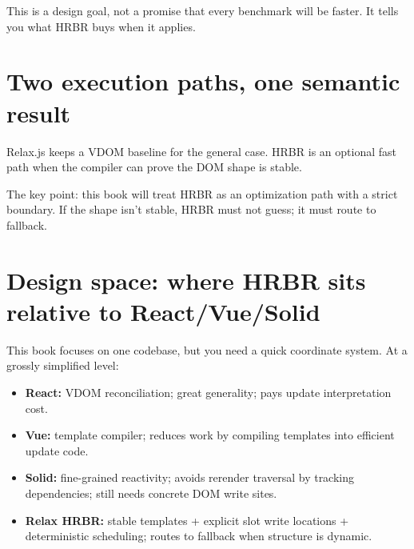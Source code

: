This is a design goal, not a promise that every benchmark will be faster.
It tells you what HRBR buys when it applies.

\section{Two execution paths, one semantic result}

Relax.js keeps a VDOM baseline for the general case.
HRBR is an optional fast path when the compiler can prove the DOM shape is stable.

\begin{center}
\end{center}

The key point: this book will treat HRBR as an optimization path with a strict boundary.
If the shape isn't stable, HRBR must not guess; it must route to fallback.

\section{Design space: where HRBR sits relative to React/Vue/Solid}

This book focuses on one codebase, but you need a quick coordinate system.
At a grossly simplified level:

\begin{itemize}
  \item \textbf{React:} VDOM reconciliation; great generality; pays update interpretation cost.
  \item \textbf{Vue:} template compiler; reduces work by compiling templates into efficient update code.
  \item \textbf{Solid:} fine-grained reactivity; avoids rerender traversal by tracking dependencies; still needs concrete DOM write sites.
  \item \textbf{Relax HRBR:} stable templates + explicit slot write locations + deterministic scheduling; routes to fallback when structure is dynamic.
\end{itemize}

